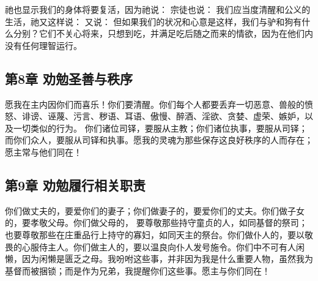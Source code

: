祂也显示我们的身体将要复活，因为祂说： \newline{} 宗徒也说：  \newline{} 我们应当度清醒和公义的生活，祂又这样说：  \newline{} 又说：  \newline{} 但如果我们的状况和心意是这样，我们与驴和狗有什么分别？它们不关心将来，只想到吃，并满足吃后随之而来的情欲，因为在他们内没有任何理智运行。\par


\subsection{第8章  劝勉圣善与秩序}

愿我在主内因你们而喜乐！你们要清醒。你们每个人都要丢弃一切恶意、兽般的愤怒、诽谤、诬蔑、污言、秽语、耳语、傲慢、醉酒、淫欲、贪婪、虚荣、嫉妒，以及一切类似的行为。  \newline{} 你们诸位司铎，要服从主教；你们诸位执事，要服从司铎；而你们众人，要服从司铎和执事。愿我的灵魂为那些保存这良好秩序的人而存在；愿主常与他们同在！\par


\subsection{第9章  劝勉履行相关职责}

你们做丈夫的，要爱你们的妻子；你们做妻子的，要爱你们的丈夫。你们做子女的，要孝敬父母。你们做父母的，  \newline{} 要尊敬那些持守童贞的人，如同基督的祭司；也要尊敬那些在庄重品行上持守的寡妇，如同天主的祭台。你们做仆人的，要以敬畏的心服侍主人。你们做主人的，要以温良向仆人发号施令。你们中不可有人闲懒，因为闲懒是匮乏之母。我吩咐这些事，并非因为我是什么重要人物，虽然我为基督而被捆锁；而是作为兄弟，我提醒你们这些事。愿主与你们同在！\par

